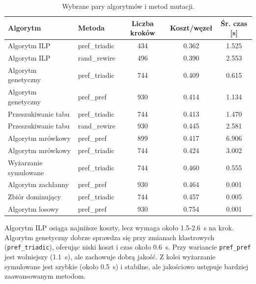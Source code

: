 \begin{table}[H]
    \centering
    \caption{Wybrane pary algorytmów i metod mutacji.}
    \label{tab:dyn-synth-selected-best}
    \begin{tabular}{llccc}
        \toprule
        \textbf{Algorytm}     & \textbf{Metoda} & \textbf{Liczba kroków} & \textbf{Koszt/węzeł} & \textbf{Śr. czas [s]} \\
        \midrule
        Algorytm ILP          & pref\_triadic   & 434                    & 0.362                & 1.525                 \\
        Algorytm ILP          & rand\_rewire    & 496                    & 0.390                & 2.553                 \\
        Algorytm genetyczny   & pref\_triadic   & 744                    & 0.409                & 0.615                 \\
        Algorytm genetyczny   & pref\_pref      & 930                    & 0.414                & 1.134                 \\
        Przeszukiwanie tabu   & pref\_triadic   & 744                    & 0.413                & 1.470                 \\
        Przeszukiwanie tabu   & rand\_rewire    & 930                    & 0.445                & 2.581                 \\
        Algorytm mrówkowy     & pref\_pref      & 899                    & 0.417                & 6.906                 \\
        Algorytm mrówkowy     & pref\_triadic   & 744                    & 0.424                & 3.002                 \\
        Wyżarzanie symulowane & pref\_triadic   & 744                    & 0.460                & 0.555                 \\
        Algorytm zachłanny    & pref\_pref      & 930                    & 0.464                & 0.001                 \\
        Zbiór dominujący      & pref\_triadic   & 744                    & 0.457                & 0.005                 \\
        Algorytm losowy       & pref\_pref      & 930                    & 0.754                & 0.001                 \\
        \bottomrule
    \end{tabular}
\end{table}

Algorytm ILP osiąga najniższe koszty, lecz wymaga około 1.5-\SI{2.6}{\second} na krok. Algorytm genetyczny dobrze sprawdza się przy zmianach klastrowych (\texttt{pref\_triadic}), oferując niski koszt i czas około \SI{0.6}{\second}. Przy wariancie \texttt{pref\_pref} jest wolniejszy (\SI{1.1}{\second}), ale zachowuje dobrą jakość. Z kolei wyżarzanie symulowane jest szybkie (około \SI{0.5}{\second}) i stabilne, ale jakościowo ustępuje bardziej zaawansowanym metodom.

